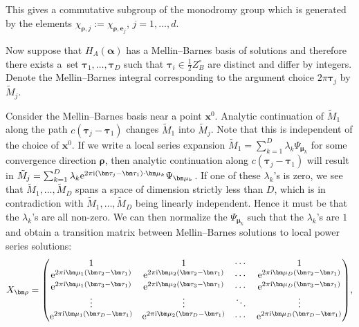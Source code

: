 This gives a commutative subgroup of the monodromy group which is generated by the elements $\chi_{\bm\rho,j} := \chi_{\bm\rho,\bm{e}_j}$, $j=1,\dots,d$.

Now suppose that $H_{A}(\bm{\alpha})$ has a Mellin--Barnes basis of solutions and therefore
there exists a~set $\bm{\tau}_1,\dots,\bm{\tau}_D$ such that
$\bm{\tau}_i \in \frac{1}{2}Z_B^{\circ}$ are distinct and differ by integers.
Denote the Mellin--Barnes integral corresponding to the argument choice
$2\pi\bm\tau_j$ by $\tilde{M}_j$.

Consider the Mellin--Barnes basis near a point $\bm{x}^0$. Analytic continuation
of $\tilde{M}_1$ along the path $c(\bm\tau_j-\bm\tau_1)$ changes $\tilde{M}_1$ into $\tilde{M}_j$. Note that this
is independent of the choice of $\bm{x}^0$.
If we write a local series expansion
$\tilde{M}_1 = \sum_{k=1}^{D} \lambda_k \Psi_{\bm\mu_k}$ for some
convergence direction $\bm\rho$, then analytic continuation along
$c(\bm\tau_j-\bm\tau_1)$ will result in
$\tilde{M}_j = \sum_{k=1}^{D} \lambda_k {\rm e}^{2\pi {\rm i}(\bm\tau_j-\bm\tau_1)\cdot \bm\mu_k}
\Psi_{\bm\mu_k}$.
If one of these $\lambda_k$'s is zero, we see that $\tilde{M}_1,\dots,\tilde{M}_D$ spans a space of dimension strictly less than $D$, which is in contradiction with $\tilde{M}_1,\dots,\tilde{M}_D$ being linearly independent. Hence it must be that the $\lambda_k$'s are all non-zero. We can then normalize the $\Psi_{\bm\mu_k}$ such that the $\lambda_k$'s are $1$ and obtain a transition matrix between Mellin--Barnes solutions to local power series solutions:
\begin{gather}X_{\bm\rho} = \begin{pmatrix}
 1 & 1 & \cdots & 1 \\
 {\rm e}^{2\pi {\rm i} \bm\mu_1(\bm\tau_{2} - \bm\tau_{1})} & {\rm e}^{2\pi {\rm i} \bm\mu_2(\bm\tau_{2} - \bm\tau_{1})} & \cdots & {\rm e}^{2\pi {\rm i} \bm\mu_D(\bm\tau_{2} - \bm\tau_{1})} \\
 {\rm e}^{2\pi {\rm i} \bm\mu_1(\bm\tau_{3} - \bm\tau_{1})} & {\rm e}^{2\pi {\rm i} \bm\mu_2(\bm\tau_{3} - \bm\tau_{1}) } & \cdots & {\rm e}^{2\pi {\rm i} \bm\mu_D(\bm\tau_{3} - \bm\tau_{1})} \\
 \vdots & \vdots & \ddots & \vdots \\
 {\rm e}^{2\pi {\rm i} \bm\mu_1(\bm\tau_{D} - \bm\tau_{1})} & {\rm e}^{2\pi {\rm i} \bm\mu_2(\bm\tau_{D} - \bm\tau_{1})} & \cdots & {\rm e}^{2\pi {\rm i} \bm\mu_D(\bm\tau_{D} - \bm\tau_{1})}
 \end{pmatrix}\!,\label{eq-Xrho}\end{gather}
